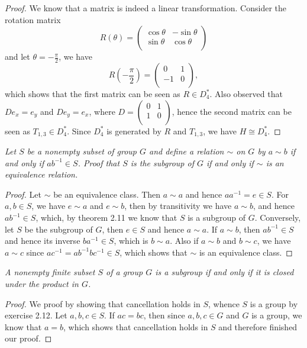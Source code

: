 \begin{proof}
We know that a matrix is indeed a linear transformation. Consider the rotation matrix
$$
R\left( \theta \right) =\left( \begin{matrix}
	\cos \theta&		-\sin \theta\\
	\sin \theta&		\cos \theta\\
\end{matrix} \right) 
$$
and let $\theta=-\frac{\pi}{2}$, we have 
$$
R\left( -\frac{\pi}{2} \right) =\left( \begin{matrix}
	0&		1\\
	-1&		0\\
\end{matrix} \right) ,
$$
which shows that the first matrix can be seen as $R\in D_4^*$. Also observed that $De_x=e_y$ and $De_y=e_x$, where $D=\left( \begin{matrix}
	0&		1\\
	1&		0\\
\end{matrix} \right) $, hence the second matrix can be seen as $T_{1,3}\in D_4^*$. Since $D_4^*$ is generated by $R$ and $T_{1,3}$, we have $H\cong D_4^*$.
\end{proof}
\begin{problem}\em
Let $S$ be a nonempty subset of group $G$ and define a relation $\sim$ on $G$ by $a\sim b$ if and only if $ab^{-1}\in S$. Proof that $S$ is the subgroup of $G$ if and only if $\sim$ is an equivalence relation.
\end{problem}
\begin{proof}
Let $\sim$ be an equivalence class. Then $a\sim a$ and hence $aa^{-1}=e\in S$. For $a,b\in S$, we have $e\sim a$ and $e\sim b$, then by transitivity we have $a\sim b$, and hence $ab^{-1}\in S$, which, by theorem 2.11 we know that $S$ is a subgroup of $G$. Conversely, let $S$ be the subgroup of $G$, then $e\in S$ and hence $a\sim a$. If $a\sim b$, then $ab^{-1}\in S$ and hence its inverse $ba^{-1}\in S$, which is $b\sim a$. Also if $a\sim b$ and $b\sim c$, we have $a\sim c$ since $ac^{-1}=ab^{-1}bc^{-1}\in S$, which shows that $\sim$ is an equivalence class.
\end{proof}
\begin{problem}\em
A nonempty finite subset $S$ of a group $G$ is a subgroup if and only if it is closed under the product in $G$.
\end{problem}
\begin{proof}
We proof by showing that cancellation holds in $S$, whence $S$ is a group by exercise 2.12. Let $a,b,c\in S$. If $ac=bc$, then since $a,b,c\in G$ and $G$ is a group, we know that $a=b$, which shows that cancellation holds in $S$ and therefore finished our proof.
\end{proof}
